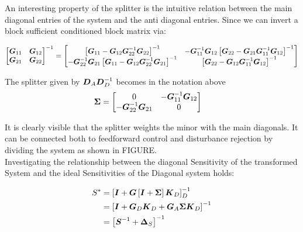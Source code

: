 An interesting property of the splitter is the intuitive relation between the main diagonal entries of the system and the anti diagonal entries. Since we can invert a block sufficient conditioned block matrix via:

\begin{align}
\begin{split}
\begin{bmatrix}
\mbox{\boldmath$G$}_{11} & \mbox{\boldmath$G$}_{12} \\
\mbox{\boldmath$G$}_{21} & \mbox{\boldmath$G$}_{22} 
\end{bmatrix}^{-1} &= \begin{bmatrix}
\left[\mbox{\boldmath$G$}_{11} - \mbox{\boldmath$G$}_{12}\mbox{\boldmath$G$}_{22}^{-1}\mbox{\boldmath$G$}_{22}\right]^{-1} & -\mbox{\boldmath$G$}_{11}^{-1}\mbox{\boldmath$G$}_{12}\left[\mbox{\boldmath$G$}_{22} - \mbox{\boldmath$G$}_{21}\mbox{\boldmath$G$}_{11}^{-1}\mbox{\boldmath$G$}_{12}\right]^{-1}  \\
-\mbox{\boldmath$G$}_{22}^{-1}\mbox{\boldmath$G$}_{21}\left[\mbox{\boldmath$G$}_{11} - \mbox{\boldmath$G$}_{12}\mbox{\boldmath$G$}_{22}^{-1}\mbox{\boldmath$G$}_{21}\right]^{-1}  & \left[\mbox{\boldmath$G$}_{22} - \mbox{\boldmath$G$}_{12}\mbox{\boldmath$G$}_{11}^{-1}\mbox{\boldmath$G$}_{12}\right]^{-1} 
\end{bmatrix} \\
\end{split}
\end{align}

The splitter given by $\mbox{\boldmath$D$}_A\mbox{\boldmath$D$}_D^{-1}$ becomes in the notation above
\begin{align}
\begin{split}
\mbox{\boldmath$\Sigma$} &= \begin{bmatrix}
0 & -\mbox{\boldmath$G$}_{11}^{-1}\mbox{\boldmath$G$}_{12}\\
-\mbox{\boldmath$G$}_{22}^{-1}\mbox{\boldmath$G$}_{21}  & 0
\end{bmatrix}
\end{split}
\end{align}

It is clearly visible that the splitter weights the minor with the main diagonals. It can be connected both to feedforward control and disturbance rejection by dividing the system as shown in FIGURE.\\

Investigating the relationship between the diagonal Sensitivity of the transformed System and the ideal Sensitivities of the Diagonal system holds:

\begin{align}
\begin{split}
S^* &= \left[\mbox{\boldmath$I$}+\mbox{\boldmath$G$} \left[ \mbox{\boldmath$I$} + \mbox{\boldmath$\Sigma$} \right] \mbox{\boldmath$K$}_D \right]_D^{-1} \\
&= \left[\mbox{\boldmath$I$}+\mbox{\boldmath$G$}_D \mbox{\boldmath$K$}_D + \mbox{\boldmath$G$}_A \mbox{\boldmath$\Sigma$} \mbox{\boldmath$K$}_D  \right]^{-1} \\
&= \left[ \mbox{\boldmath$S$}^{-1} + \mbox{\boldmath$\Delta$}_{S}\right]^{-1}
\end{split}
\label{c:control:e:sensitivityerror}
\end{align}

